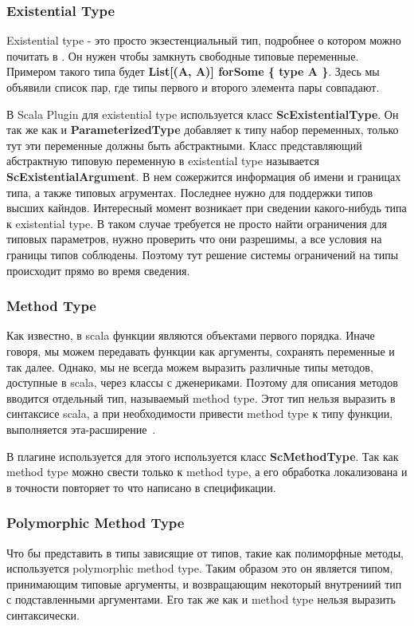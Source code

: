 \subsubsection{Existential Type}
Existential type - это просто экзестенциальный тип, подробнее о котором можно
почитать в \cite{type_theory}.
Он нужен чтобы замкнуть свободные типовые переменные.
Примером такого типа будет \textbf{List[(A, A)] forSome \{ type A \}}.
Здесь мы объявили список пар, где типы первого и второго элемента пары совпадают.

В Scala Plugin для existential type используется класс
\textbf{ScExistentialType}.
Он так же как и \textbf{ParameterizedType} добавляет к типу набор переменных,
только тут эти переменные должны быть абстрактными.
Класс представляющий абстрактную типовую переменную в existential type
называется \textbf{ScExistentialArgument}.
В нем сожержится информация об имени и границах типа, а также типовых агрументах.
Последнее нужно для поддержки типов высших кайндов.
Интересный момент возникает при сведении какого-нибудь типа к existential type.
В таком случае требуется не просто найти ограничения для типовых параметров,
нужно проверить что они разрешимы, а все условия на границы типов соблюдены.
Поэтому тут решение системы ограничений на типы происходит прямо во время сведения.

\subsubsection{Method Type}

Как известно, в scala функции являются объектами первого порядка.
Иначе говоря, мы можем передавать функции как аргументы, сохранять переменные
и так далее.
Однако, мы не всегда можем выразить различные типы методов, доступные в scala,
через классы с дженериками.
Поэтому для описания методов вводится отдельный тип, называемый method type.
Этот тип нельзя выразить в синтаксисе scala, а при необходимости привести
method type к типу функции, выполняется эта-расширение~\cite{eta_expansion}.

В плагине используется для этого используется класс \textbf{ScMethodType}.
Так как method type можно свести только к method type, а его обработка
локализована и в точности повторяет то что написано в спецификации.

\subsubsection{Polymorphic Method Type}
Что бы представить в типы зависящие от типов, такие как полиморфные методы,
используется polymorphic method type.
Таким образом это он является типом, принимающим типовые аргументы,
и возвращающим некоторый внутрениий тип с подставленными аргументами.
Его так же как и method type нельзя выразить синтаксически.

